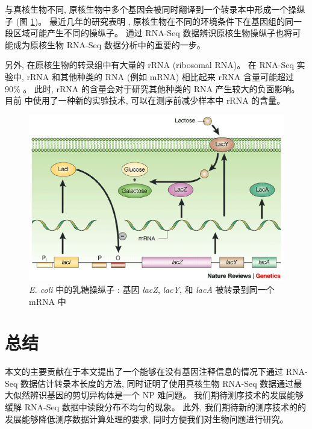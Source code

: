 与真核生物不同, 原核生物中多个基因会被同时翻译到一个转录本中形成一个操纵子 
(图 \ref{e.coli.lactose.operon})。 
最近几年的研究表明 \cite{MarcGuell11272009, koide2009prevalence}, 
原核生物在不同的环境条件下在基因组的同一段区域可能产生不同的操纵子。 
通过 RNA-Seq 数据辨识原核生物操纵子也将可能成为原核生物 RNA-Seq 数据分析中的重要的一步。 

另外, 在原核生物的转录组中有大量的 rRNA (ribosomal RNA)。  
在 RNA-Seq 实验中, 
rRNA 和其他种类的 RNA (例如 mRNA) 相比起来 rRNA 含量可能超过 
90\% \cite{giannoukos2012efficient}。 
此时, rRNA 的含量会对于研究其他种类的 RNA 产生较大的负面影响。 
目前  中使用了一种新的实验技术, 
可以在测序前减少样本中 rRNA 的含量。 

\begin{figure}[!t]
\centering
\includegraphics[width=\textwidth]{figures/disc/e-coli-lactose-operon.png}
\caption[\textit{E. coli} 中的乳糖操纵子 \cite{shuman2003art}]
{\textit{E. coli} 中的乳糖操纵子 \cite{shuman2003art}: 
基因 \textit{lacZ}, \textit{lacY}, 和 \textit{lacA} 被转录到同一个 mRNA 中}
\label{e.coli.lactose.operon}
\end{figure}

\section{总结}
本文的主要贡献在于本文提出了一个能够在没有基因注释信息的情况下通过 RNA-Seq 数据估计转录本长度的方法, 
同时证明了使用真核生物 RNA-Seq 数据通过最大似然辨识基因的剪切异构体是一个 NP 难问题。
我们期待测序技术的发展能够缓解 RNA-Seq 数据中读段分布不均匀的现象。
此外, 我们期待新的测序技术的的发展能够降低测序数据计算处理的要求, 
同时方便我们对生物问题进行研究。









